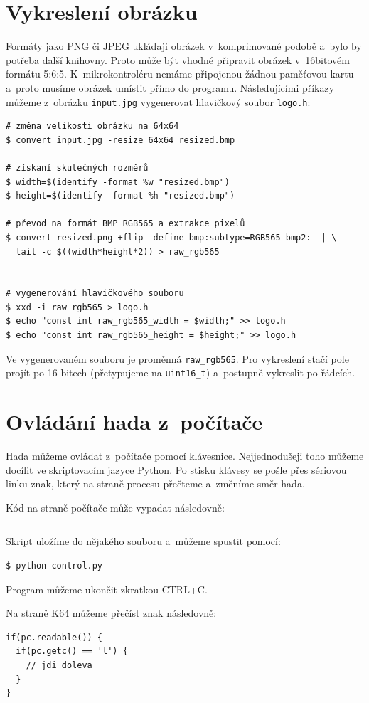 \documentclass[12pt]{article}
\begin{document}
\section{Vykreslení obrázku}
Formáty jako PNG či JPEG ukládaji obrázek v~komprimované podobě a~bylo by potřeba další knihovny.
Proto může být vhodné připravit obrázek v~16bitovém formátu 5:6:5.
K~mikrokontroléru nemáme připojenou žádnou paměťovou kartu a~proto musíme obrázek umístit přímo do programu.
Následujícími příkazy můžeme z~obrázku \texttt{input.jpg} vygenerovat hlavičkový soubor \texttt{logo.h}:
\begin{verbatim}
# změna velikosti obrázku na 64x64
$ convert input.jpg -resize 64x64 resized.bmp

# získaní skutečných rozměrů
$ width=$(identify -format %w "resized.bmp")
$ height=$(identify -format %h "resized.bmp")

# převod na formát BMP RGB565 a extrakce pixelů
$ convert resized.png +flip -define bmp:subtype=RGB565 bmp2:- | \
  tail -c $((width*height*2)) > raw_rgb565


# vygenerování hlavičkového souboru
$ xxd -i raw_rgb565 > logo.h 
$ echo "const int raw_rgb565_width = $width;" >> logo.h
$ echo "const int raw_rgb565_height = $height;" >> logo.h
\end{verbatim}

Ve vygenerovaném souboru je proměnná \texttt{raw\_rgb565}.
Pro vykreslení stačí pole projít po 16 bitech (přetypujeme na \texttt{uint16_t}) a~postupně vykreslit po řádcích.

\section{Ovládání hada z~počítače}
Hada můžeme ovládat z~počítače pomocí klávesnice.
Nejjednodušeji toho můžeme docílit ve skriptovacím jazyce Python.
Po stisku klávesy se pošle přes sériovou linku znak, který na straně procesu přečteme a~změníme směr hada.

Kód na straně počítače může vypadat následovně:
\inputminted{python}{control.py}
Skript uložíme do nějakého souboru a~můžeme spustit pomocí:
\begin{verbatim}
$ python control.py
\end{verbatim}
Program můžeme ukončit zkratkou \textsc{CTRL+C}.

\newpage
Na straně K64 můžeme přečíst znak následovně:
\begin{verbatim}
if(pc.readable()) {
  if(pc.getc() == 'l') {
    // jdi doleva
  }
}
\end{verbatim}
\end{document}
